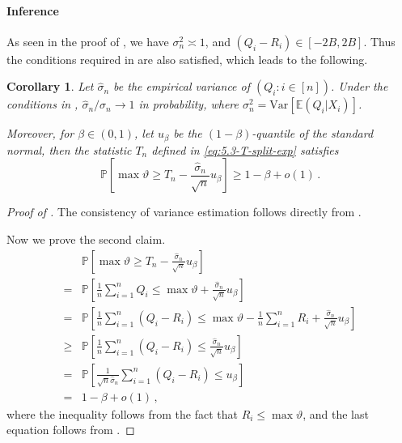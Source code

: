 \documentclass[11pt]{article}
\theoremstyle{plain}
\newtheorem{corollary}[theorem]{Corollary}
\newcommand{\var}{\mathrm{Var}}
\begin{document}
\paragraph{Inference}
As seen in the proof of , we have $\sigma_{n}^2\asymp 1$, and $(Q_i-R_i)\in[-2B, 2B]$. Thus the conditions required in  are also satisfied, which leads to the following.
\begin{corollary}\label{cor:5.3-var_est_argmin}
    Let $\hat\sigma_n$ be the empirical variance of $(Q_i:i\in [n])$. Under the conditions in , $\hat\sigma_n/\sigma_n\rightarrow 1$ in probability, where $\sigma_n^2=\var[\mathbb E(Q_i|X_i)]$.

Moreover, for $\beta\in(0,1)$, let $u_\beta$ be the $(1-\beta)$-quantile of the standard normal, then the statistic $T_n$ defined in \eqref{eq:5.3-T-split-exp} satisfies
    \begin{equation}\label{eq:5.3-max-val-conf-lower-bound}
    \mathbb P\left[\max\vartheta \ge T_n-\frac{\hat\sigma_n}{\sqrt{n}}u_\beta\right]\ge 1-\beta+o(1)\,.
    \end{equation}
\end{corollary}

\begin{proof}[Proof of ]
The consistency of variance estimation follows directly from .  

Now we prove the second claim.
    \begin{align*}
       & \mathbb P\left[\max\vartheta \ge T_n-\frac{\hat\sigma_n}{\sqrt{n}}u_\beta\right]\\
  =&  \mathbb P\left[\frac{1}{n}\sum_{i=1}^n Q_i \le \max\vartheta+\frac{\hat\sigma_n}{\sqrt{n}}u_\beta\right]  \\
  =&  \mathbb P\left[\frac{1}{n}\sum_{i=1}^n (Q_i-R_i) \le \max\vartheta -\frac{1}{n}\sum_{i=1}^n R_i +\frac{\hat\sigma_n}{\sqrt{n}}u_\beta\right] \\
  \ge &  \mathbb P\left[\frac{1}{n}\sum_{i=1}^n (Q_i-R_i) \le \frac{\hat\sigma_n}{\sqrt{n}}u_\beta\right] \\
  =&  \mathbb P\left[\frac{1}{\sqrt{n}\hat\sigma_n}\sum_{i=1}^n (Q_i-R_i) \le u_\beta\right]\\
  = & 1-\beta+o(1)\,,
    \end{align*}
    where the inequality follows from the fact that $R_i\le \max\vartheta$, and the last equation follows from .
\end{proof}
\end{document}
